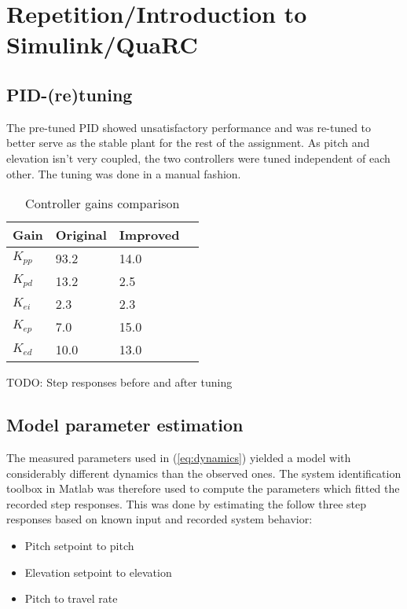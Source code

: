 \section{Repetition/Introduction to Simulink/QuaRC}\label{sec:prob1}

\subsection{PID-(re)tuning}
The pre-tuned PID showed unsatisfactory performance and was re-tuned to better serve as the stable plant for the rest of the assignment. As pitch and elevation isn't very coupled, the two controllers were tuned independent of each other. The tuning was done in a manual fashion.

\begin{table}[hp]
	\centering
	\caption{Controller gains comparison}
	\begin{tabular}{llll}
		\hline
		Gain & Original & Improved \\
		\hline
		$K_{pp}$ & 93.2 & 14.0 \\
		$K_{pd}$ & 13.2 & 2.5 \\
		$K_{ei}$ & 2.3 & 2.3 \\
		$K_{ep}$ & 7.0 & 15.0 \\
		$K_{ed}$ & 10.0 & 13.0 \\
	\end{tabular}
	\label{tab:gains}
\end{table}

TODO: Step responses before and after tuning


\subsection{Model parameter estimation}
The measured parameters used in (\ref{eq:dynamics}) yielded a model with considerably different dynamics than the observed ones. The system identification toolbox in Matlab was therefore used to compute the parameters which fitted the recorded step responses. This was done by estimating the follow three step responses based on known input and recorded system behavior:

\begin{itemize}
	\item{Pitch setpoint to pitch}
	\item{Elevation setpoint to elevation}
	\item{Pitch to travel rate}
\end{itemize}


